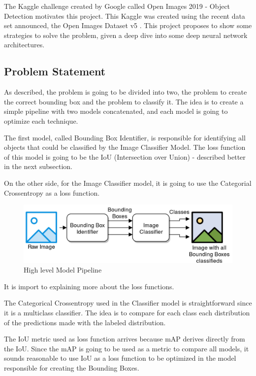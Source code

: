 \documentclass[11pt, a4paper, onecolumn]{article}
\begin{document}
The Kaggle challenge created by Google called Open Images 2019 - Object Detection \cite{kaggle} motivates this project. This Kaggle was created using the recent data set announced, the Open Images Dataset v5 \cite{google:1}. This project proposes to show some strategies to solve the problem, given a deep dive into some deep neural network architectures. 

\subsection{Problem Statement}

As described, the problem is going to be divided into two, the problem to create the correct bounding box and the problem to classify it. The idea is to create a simple pipeline with two models concatenated, and each model is going to optimize each technique.

The first model, called Bounding Box Identifier, is responsible for identifying all objects that could be classified by the Image Classifier Model. The loss function of this model is going to be the IoU (Intersection over Union) - described better in the next subsection.

On the other side, for the Image Classifier model, it is going to use the Categorial Crossentropy as a loss function.

\begin{figure}[ht]
	\centering
	\includegraphics[width=1\textwidth]{high-level-architecture.jpg}
	\caption{\scriptsize High level Model Pipeline}
\end{figure}

It is import to explaining more about the loss functions. 

The Categorical Crossentropy used in the Classifier model is straightforward since it is a multiclass classifier. The idea is to compare for each class each distribution of the predictions made with the labeled distribution.

The IoU metric used as loss function arrives because mAP derives directly from the IoU. Since the mAP is going to be used as a metric to compare all models, it sounds reasonable to use IoU as a loss function to be optimized in the model responsible for creating the Bounding Boxes.
\end{document}
